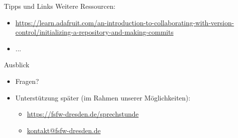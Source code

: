 \documentclass{beamer}
\begin{document}

\begin{frame}[label=link10]{Tipps und Links}
Weitere Ressourcen:
\tiny
\begin{itemize}
 \item
\url{https://learn.adafruit.com/an-introduction-to-collaborating-with-version-control/initializing-a-repository-and-making-commits}
\item ...
\end{itemize}


\end{frame}




\begin{frame}[label=uj]{Ausblick}
\begin{itemize}
 \item Fragen?\\[10mm]
   \pause
 \item Unterstützung später {\tiny (im Rahmen unserer Möglichkeiten)}:
   \begin{itemize}
   \item \url{https://fsfw-dresden.de/sprechstunde}
   \item \url{kontakt@fsfw-dresden.de}
   \end{itemize}
\end{itemize}



\end{frame}

\end{document}
